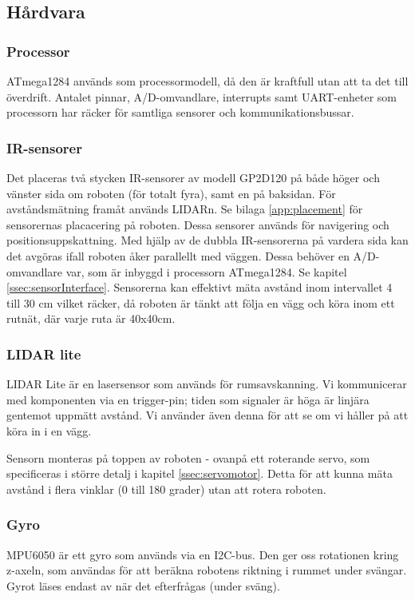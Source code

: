 \documentclass[a4paper,11pt]{article}
\begin{document}
\clearpage

\subsection{Hårdvara}

\subsubsection{Processor}
ATmega1284 används som processormodell, då den är kraftfull utan att ta det till överdrift. Antalet pinnar, A/D-omvandlare, interrupts samt UART-enheter som processorn har räcker för samtliga sensorer och kommunikationsbussar.

\subsubsection{IR-sensorer} \label{sssec:sonicsensors}
Det placeras två stycken IR-sensorer av modell GP2D120 på både höger och vänster sida om roboten (för totalt fyra), samt en på baksidan. För avståndsmätning framåt används LIDARn. Se bilaga \ref{app:placement} för sensorernas placacering på roboten. Dessa sensorer används för navigering och positionsuppskattning. Med hjälp av de dubbla IR-sensorerna på vardera sida kan det avgöras ifall roboten åker parallellt med väggen. Dessa behöver en A/D-omvandlare var, som är inbyggd i processorn ATmega1284. Se kapitel \ref{ssec:sensorInterface}. Sensorerna kan effektivt mäta avstånd inom intervallet 4 till 30 cm vilket räcker, då roboten är tänkt att följa en vägg och köra inom ett rutnät, där varje ruta är 40x40cm.

\subsubsection{LIDAR lite} \label{sssec:lidar}
LIDAR Lite är en lasersensor som används för rumsavskanning. Vi kommunicerar med komponenten via en trigger-pin; tiden som signaler är höga är linjära gentemot uppmätt avstånd. Vi använder även denna för att se om vi håller på att köra in i en vägg.

Sensorn monteras på toppen av roboten - ovanpå ett roterande servo, som specificeras i större detalj i kapitel \ref{ssec:servomotor}. Detta för att kunna mäta avstånd i flera vinklar (0 till 180 grader) utan att rotera roboten.

\subsubsection{Gyro} \label{sssec:imu}
MPU6050 är ett gyro som används via en I2C-bus. Den ger oss rotationen kring z-axeln, som användas för att beräkna robotens riktning i rummet under svängar. Gyrot läses endast av när det efterfrågas (under sväng).
\end{document}

